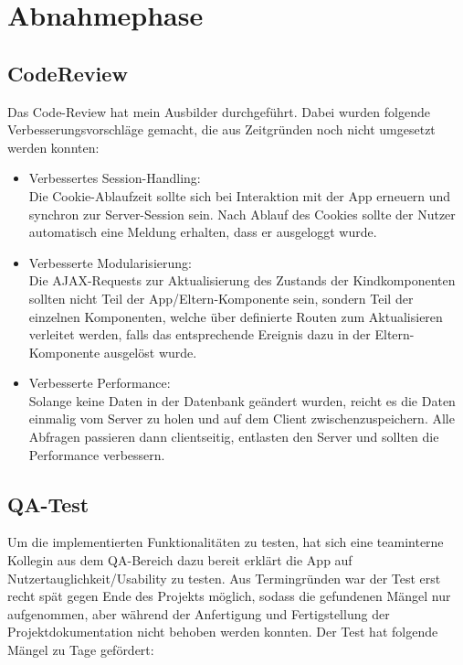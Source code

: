 \section{Abnahmephase} 
\label{sec:Abnahmephase}

\subsection{CodeReview}
Das Code-Review hat mein Ausbilder durchgeführt. Dabei wurden folgende Verbesserungsvorschläge gemacht, die aus Zeitgründen noch nicht umgesetzt werden konnten:

\begin{itemize}
\item Verbessertes Session-Handling:\\
Die Cookie-Ablaufzeit sollte sich bei Interaktion mit der App erneuern und synchron zur Server-Session sein. Nach Ablauf des Cookies sollte der Nutzer automatisch eine Meldung erhalten, dass er ausgeloggt wurde.
\item Verbesserte Modularisierung:\\
Die AJAX-Requests zur Aktualisierung des Zustands der Kindkomponenten sollten nicht Teil der App/Eltern-Komponente sein, sondern Teil der einzelnen Komponenten, welche über definierte Routen zum Aktualisieren verleitet werden, falls das entsprechende Ereignis dazu in der Eltern-Komponente ausgelöst wurde.
\item Verbesserte Performance:\\
Solange keine Daten in der Datenbank geändert wurden, reicht es die Daten einmalig vom Server zu holen und auf dem Client zwischenzuspeichern. Alle Abfragen passieren dann clientseitig, entlasten den Server und sollten die Performance verbessern.

\end{itemize}

\subsection{QA-Test}

Um die implementierten Funktionalitäten zu testen, hat sich eine teaminterne Kollegin aus dem QA-Bereich dazu bereit erklärt die App auf Nutzertauglichkeit/Usability zu testen. Aus Termingründen war der Test erst recht spät gegen Ende des Projekts möglich, sodass die gefundenen Mängel nur aufgenommen, aber während der Anfertigung und Fertigstellung der Projektdokumentation nicht behoben werden konnten. Der Test hat folgende Mängel zu Tage gefördert:

